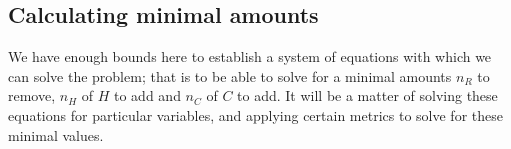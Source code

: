 \documentclass{article}
\begin{document}
\begin{example}
\end{example}


\subsection{Calculating minimal amounts}

We have enough bounds here to establish a system of equations with which we can solve the problem;
that is to be able to solve for a minimal amounts $n_R$ to remove, $n_H$ of $H$ to add and $n_C$ of
$C$ to add. It will be a matter of solving these equations for particular variables, and applying
certain metrics to solve for these minimal values.
\end{document}
